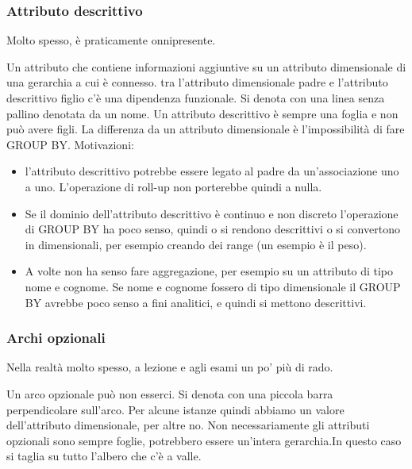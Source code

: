 \subsubsection{Attributo descrittivo}
\begin{info}
	Molto spesso, è praticamente onnipresente.
\end{info}
Un attributo che contiene informazioni aggiuntive su un attributo dimensionale di una gerarchia a cui è connesso.
tra l'attributo dimensionale padre e l'attributo descrittivo figlio c'è una dipendenza funzionale. Si denota con una linea senza pallino denotata da un nome. Un attributo descrittivo è sempre una foglia e non può avere figli. La differenza da un attributo dimensionale è l'impossibilità di fare GROUP BY.\newline
Motivazioni:\newline
\begin{itemize}
	\item l'attributo descrittivo potrebbe essere legato al padre da un'associazione uno a uno. L'operazione di roll-up non porterebbe quindi a nulla.
	\item Se il dominio dell'attributo descrittivo è continuo e non discreto l'operazione di GROUP BY ha poco senso, quindi o si rendono descrittivi o si convertono in dimensionali, per esempio creando dei range (un esempio è il peso).
	\item A volte non ha senso fare aggregazione, per esempio su un attributo di tipo nome e cognome. Se nome e cognome fossero di tipo dimensionale il GROUP BY avrebbe poco senso a fini analitici, e quindi si mettono descrittivi.
\end{itemize}

\subsubsection{Archi opzionali}
\begin{info}
	Nella realtà molto spesso, a lezione e agli esami un po' più di rado.
\end{info}
Un arco opzionale può non esserci. Si denota con una piccola barra perpendicolare sull'arco. Per alcune istanze quindi abbiamo un valore dell'attributo dimensionale, per altre no. Non necessariamente gli attributi opzionali sono sempre foglie, potrebbero essere un'intera gerarchia.In questo caso si taglia su tutto l'albero che c'è a valle.

